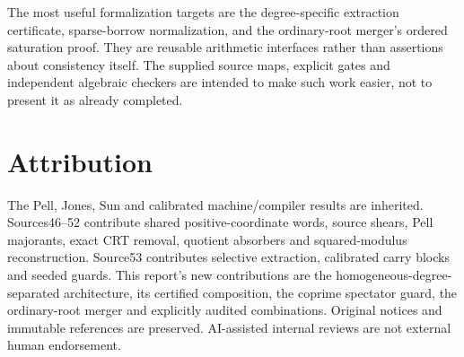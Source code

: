 \documentclass[11pt]{article}
\begin{document}
The most useful formalization targets are the degree-specific extraction
certificate, sparse-borrow normalization, and the ordinary-root merger's
ordered saturation proof. They are reusable arithmetic interfaces rather
than assertions about consistency itself. The supplied source maps,
explicit gates and independent algebraic checkers are intended to make
such work easier, not to present it as already completed.





\section*{Attribution}
The Pell, Jones, Sun and calibrated machine/compiler results are inherited.
Sources46--52 contribute shared positive-coordinate words, source shears,
Pell majorants, exact CRT removal, quotient absorbers and squared-modulus
reconstruction. Source53 contributes selective extraction, calibrated
carry blocks and seeded guards. This report's new contributions are the
homogeneous-degree-separated architecture, its certified composition,
the coprime spectator guard, the ordinary-root merger and explicitly
audited combinations. Original notices and immutable references are
preserved. AI-assisted internal reviews are not external human endorsement.
\end{document}
